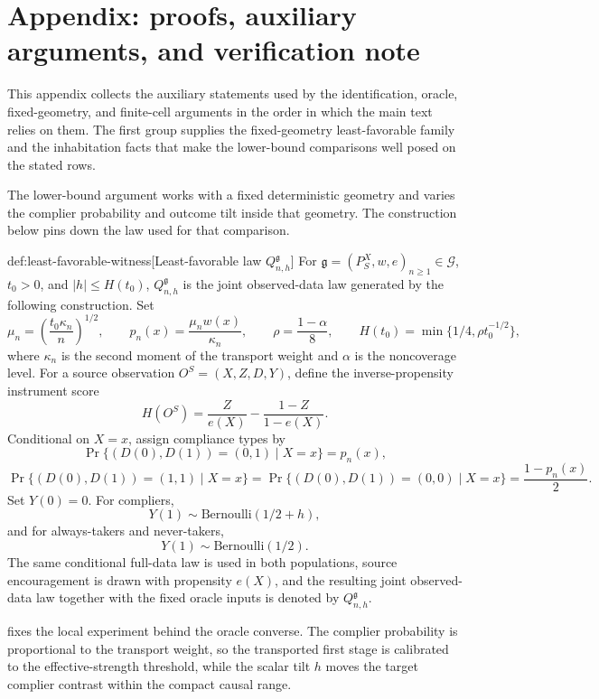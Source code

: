 \section{Appendix: proofs, auxiliary arguments, and verification note}

This appendix collects the auxiliary statements used by the identification, oracle, fixed-geometry, and finite-cell arguments in the order in which the main text relies on them. The first group supplies the fixed-geometry least-favorable family and the inhabitation facts that make the lower-bound comparisons well posed on the stated rows.

The lower-bound argument works with a fixed deterministic geometry and varies the complier probability and outcome tilt inside that geometry. The construction below pins down the law used for that comparison.

\begin{definitionv}{def:least-favorable-witness}[Least-favorable law \(Q_{n,h}^{\mathfrak g}\)]
For \(\mathfrak g=(P_S^X,w,e)_{n\ge1}\in\mathcal G\), \(t_0>0\), and \(|h|\le H(t_0)\), \(Q_{n,h}^{\mathfrak g}\) is the joint observed-data law generated by the following construction. Set
\[
\mu_n=\left(\frac{t_0\kappa_n}{n}\right)^{1/2},
\qquad
p_n(x)=\frac{\mu_n w(x)}{\kappa_n},
\qquad
\rho=\frac{1-\alpha}{8},
\qquad
H(t_0)=\min\{1/4,\rho t_0^{-1/2}\},
\]
where \(\kappa_n\) is the second moment of the transport weight and \(\alpha\) is the noncoverage level. For a source observation \(O^S=(X,Z,D,Y)\), define the inverse-propensity instrument score
\[
H(O^S)=\frac{Z}{e(X)}-\frac{1-Z}{1-e(X)}.
\]
Conditional on \(X=x\), assign compliance types by
\[
\Pr\{(D(0),D(1))=(0,1)\mid X=x\}=p_n(x),
\]
\[
\Pr\{(D(0),D(1))=(1,1)\mid X=x\}
=
\Pr\{(D(0),D(1))=(0,0)\mid X=x\}
=
\frac{1-p_n(x)}{2}.
\]
Set \(Y(0)=0\). For compliers,
\[
Y(1)\sim \mathrm{Bernoulli}(1/2+h),
\]
and for always-takers and never-takers,
\[
Y(1)\sim \mathrm{Bernoulli}(1/2).
\]
The same conditional full-data law is used in both populations, source encouragement is drawn with propensity \(e(X)\), and the resulting joint observed-data law together with the fixed oracle inputs is denoted by \(Q_{n,h}^{\mathfrak g}\).
\end{definitionv}

 fixes the local experiment behind the oracle converse. The complier probability is proportional to the transport weight, so the transported first stage is calibrated to the effective-strength threshold, while the scalar tilt \(h\) moves the target complier contrast within the compact causal range.

